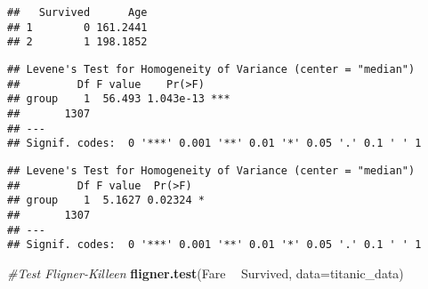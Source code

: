 \documentclass[]{article}
\newenvironment{Shaded}{\begin{snugshade}}{\end{snugshade}}
\newcommand{\AlertTok}[1]{\textcolor[rgb]{0.94,0.16,0.16}{#1}}
\newcommand{\CommentTok}[1]{\textcolor[rgb]{0.56,0.35,0.01}{\textit{#1}}}
\newcommand{\DataTypeTok}[1]{\textcolor[rgb]{0.13,0.29,0.53}{#1}}
\newcommand{\KeywordTok}[1]{\textcolor[rgb]{0.13,0.29,0.53}{\textbf{#1}}}
\newcommand{\NormalTok}[1]{#1}
\newcommand{\OperatorTok}[1]{\textcolor[rgb]{0.81,0.36,0.00}{\textbf{#1}}}
\newcommand{\StringTok}[1]{\textcolor[rgb]{0.31,0.60,0.02}{#1}}
\begin{document}
\begin{verbatim}
##   Survived      Age
## 1        0 161.2441
## 2        1 198.1852
\end{verbatim}

\begin{Shaded}
\end{Shaded}

\begin{verbatim}
## Levene's Test for Homogeneity of Variance (center = "median")
##         Df F value    Pr(>F)    
## group    1  56.493 1.043e-13 ***
##       1307                      
## ---
## Signif. codes:  0 '***' 0.001 '**' 0.01 '*' 0.05 '.' 0.1 ' ' 1
\end{verbatim}

\begin{Shaded}
\end{Shaded}

\begin{verbatim}
## Levene's Test for Homogeneity of Variance (center = "median")
##         Df F value  Pr(>F)  
## group    1  5.1627 0.02324 *
##       1307                  
## ---
## Signif. codes:  0 '***' 0.001 '**' 0.01 '*' 0.05 '.' 0.1 ' ' 1
\end{verbatim}

\begin{Shaded}
\begin{Highlighting}[]
\CommentTok{#Test Fligner-Killeen}
\KeywordTok{fligner.test}\NormalTok{(Fare }\OperatorTok{~}\StringTok{ }\NormalTok{Survived, }\DataTypeTok{data=}\NormalTok{titanic_data)}
\end{Highlighting}
\end{Shaded}
\end{document}
